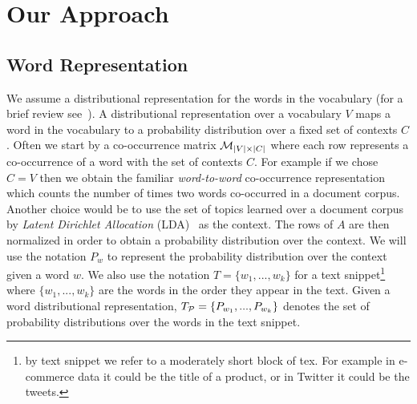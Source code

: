 \documentclass{article} %
\begin{document}
















\section{Our Approach}
\label{sec:our-approach}

\subsection{Word Representation}
\label{sec:word-representation}

We assume a distributional representation for the words in the vocabulary (for a brief review
see~\cite{Turian10wordrepresentations}). A distributional representation over a vocabulary $V$ maps a word in the vocabulary to a 
probability distribution over a fixed set of contexts $C$. Often we start by a co-occurrence matrix ${\mathcal M}_{|V|\times|C|}$ where each row represents a co-occurrence of a word with the set of contexts
$C$. For example if we chose $C=V$ then we obtain the familiar {\sl word-to-word} co-occurrence representation which counts the number
of times two words co-occurred in a document corpus. Another choice would be to use the set of topics learned over a document
corpus by {\sl Latent Dirichlet Allocation} (LDA)~\cite{Blei:2003:LDA:944919.944937} as the context. The rows of $A$
are then normalized in order to obtain a probability distribution over the context. We will use the notation $P_w$ to represent
the probability distribution over the context  given a word $w$. We also use the notation $T=\{w_1,...,w_k\}$ for a text
snippet\footnote{by text snippet we refer to a moderately short block of tex. For example in e-commerce data it could be the
title of a product, or in Twitter it could be the tweets.} where
$\{w_1,...,w_k\}$ are the words in the order they appear in the
text. Given a word distributional representation, $T_{{\mathcal P}}=\{P_{w_1},...,P_{w_k}\}$ denotes the set of probability distributions over the words
in the text snippet.
\end{document}
